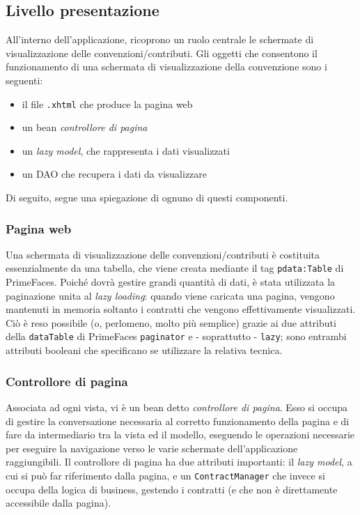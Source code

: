 \subsection{Livello presentazione}

All'interno dell'applicazione, ricoprono un ruolo centrale le schermate di visualizzazione delle convenzioni/contributi. Gli oggetti che consentono il funzionamento di una schermata di visualizzazione della convenzione sono i seguenti:

\begin{itemize}
\item il file \texttt{.xhtml} che produce la pagina web
\item un bean \textsl{controllore di pagina}
\item un \textit{lazy model}, che rappresenta i dati visualizzati
\item un DAO che recupera i dati da visualizzare
\end{itemize}

Di seguito, segue una spiegazione di ognuno di questi componenti.

\subsubsection{Pagina web}
Una schermata di visualizzazione delle convenzioni/contributi è costituita essenzialmente da una tabella, che viene creata mediante il tag \lstinline{pdata:Table} di PrimeFaces. Poiché dovrà gestire grandi quantità di dati, è stata utilizzata la paginazione unita al \textit{lazy loading}: quando viene caricata una pagina, vengono mantenuti in memoria soltanto i contratti che vengono effettivamente visualizzati. Ciò è reso possibile (o, perlomeno, molto più semplice) grazie ai due attributi della \texttt{dataTable} di PrimeFaces \texttt{paginator} e - soprattutto - \texttt{lazy}; sono entrambi attributi booleani che specificano se utilizzare la relativa tecnica.

\subsubsection{Controllore di pagina}
Associata ad ogni vista, vi è un bean detto \textsl{controllore di pagina}. Esso si occupa di gestire la conversazione necessaria al corretto funzionamento della pagina e di fare da intermediario tra la vista ed il modello, eseguendo le operazioni necessarie per eseguire la navigazione verso le varie schermate dell'applicazione raggiungibili. Il controllore di pagina ha due attributi importanti: il \textit{lazy model}, a cui si può far riferimento dalla pagina, e un \lstinline{ContractManager} che invece si occupa della logica di business, gestendo i contratti (e che non è direttamente accessibile dalla pagina).

